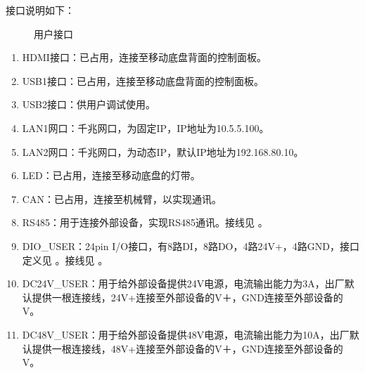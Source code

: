 \documentclass[a4paper,11pt,english,openany,oneside]{sphinxmanual}
\begin{document}
\sphinxAtStartPar
接口说明如下：

\begin{figure}[H]
\centering
\capstart

\noindent{}
\caption{用户接口}\label{\detokenize{08 _u5b89_u88c5_u4e0e_u8c03_u8bd5:id56}}\end{figure}
\begin{enumerate}
%
\item {} 
\sphinxAtStartPar
HDMI接口：已占用，连接至移动底盘背面的控制面板。

\item {} 
\sphinxAtStartPar
USB1接口：已占用，连接至移动底盘背面的控制面板。

\item {} 
\sphinxAtStartPar
USB2接口：供用户调试使用。

\item {} 
\sphinxAtStartPar
LAN1网口：千兆网口，为固定IP，IP地址为10.5.5.100。

\item {} 
\sphinxAtStartPar
LAN2网口：千兆网口，为动态IP，默认IP地址为192.168.80.10。

\item {} 
\sphinxAtStartPar
LED：已占用，连接至移动底盘的灯带。

\item {} 
\sphinxAtStartPar
CAN：已占用，连接至机械臂，以实现通讯。

\item {} 
\sphinxAtStartPar
RS485：用于连接外部设备，实现RS485通讯。接线见 {\hyperref[\detokenize{08 _u5b89_u88c5_u4e0e_u8c03_u8bd5:id35}]{}}。

\item {} 
\sphinxAtStartPar
DIO\_USER：24pin I/O接口，有8路DI，8路DO，4路24V+，4路GND，接口定义见 {\hyperref[\detokenize{08 _u5b89_u88c5_u4e0e_u8c03_u8bd5:dio-user}]{}}。接线见 {\hyperref[\detokenize{08 _u5b89_u88c5_u4e0e_u8c03_u8bd5:id28}]{}}。

\item {} 
\sphinxAtStartPar
DC24V\_USER：用于给外部设备提供24V电源，电流输出能力为3A，出厂默认提供一根连接线，24V+连接至外部设备的V＋，GND连接至外部设备的V\sphinxhyphen{}。

\item {} 
\sphinxAtStartPar
DC48V\_USER：用于给外部设备提供48V电源，电流输出能力为10A，出厂默认提供一根连接线，48V+连接至外部设备的V＋，GND连接至外部设备的V\sphinxhyphen{}。


\end{enumerate}
\end{document}

